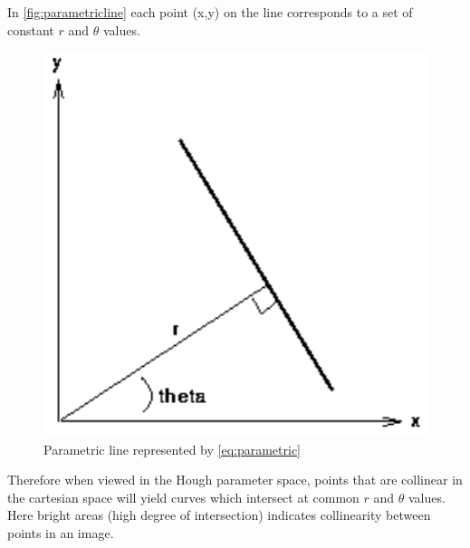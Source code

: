 In \autoref{fig:parametricline} each point (x,y) on the line corresponds to a set of constant $r$ and $\theta$ values.

\begin{figure}[!h]
	\centering
	\includegraphics[scale=0.3]{fig/parametric-line.png}
	\caption{Parametric line represented by \autoref{eq:parametric} \citep{Fisher2003}}
	\label{fig:parametricline}
\end{figure}

Therefore when viewed in the Hough parameter space, points that are collinear in the cartesian space will yield curves which intersect at common $r$ and $\theta$ values. Here bright areas (high degree of intersection) indicates collinearity between points in an image.

